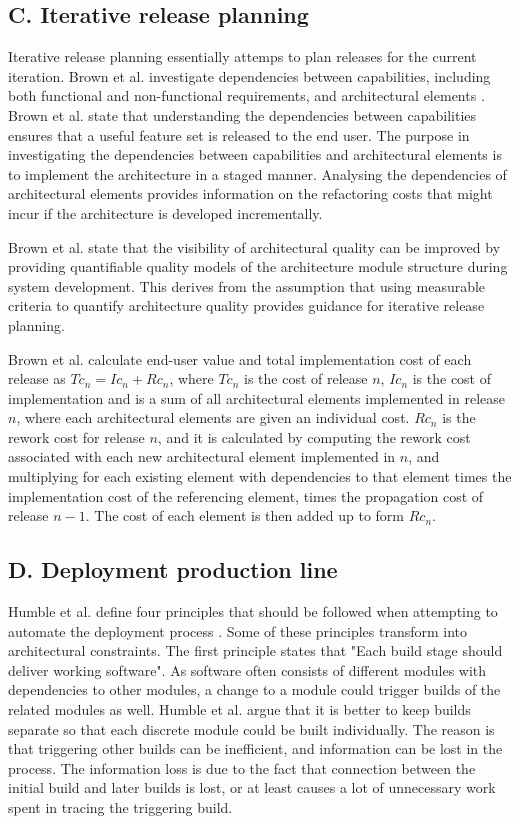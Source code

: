 \documentclass[conference]{IEEEtran}
\begin{document}
\subsection{C. Iterative release planning}

Iterative release planning essentially attemps to plan releases for the current iteration. Brown et al. investigate dependencies between capabilities, including both functional and non-functional requirements, and architectural elements \cite{brown2011analysis}. Brown et al. state that understanding the dependencies between capabilities ensures that a useful feature set is released to the end user. The purpose in investigating the dependencies between capabilities and architectural elements is to implement the architecture in a staged manner. Analysing the dependencies of architectural elements provides information on the refactoring costs that might incur if the architecture is developed incrementally.

Brown et al. state that the visibility of architectural quality can be improved by providing quantifiable quality models of the architecture module structure during system development. This derives from the assumption that using measurable criteria to quantify architecture quality provides guidance for iterative release planning.

Brown et al. calculate end-user value and total implementation cost of each release as $Tc_n = Ic_n + Rc_n$, where $Tc_n$ is the cost of release $n$, $Ic_n$ is the cost of implementation and is a sum of all architectural elements implemented in release $n$, where each architectural elements are given an individual cost. $Rc_n$ is the rework cost for release $n$, and it is calculated by computing the rework cost associated with each new architectural element implemented in $n$, and multiplying for each existing element with dependencies to that element times the implementation cost of the referencing element, times the propagation cost of release $n-1$. The cost of each element is then added up to form $Rc_n$.

\subsection{D. Deployment production line}

Humble et al. define four principles that should be followed when attempting to automate the deployment process \cite{humble2006deployment}. Some of these principles transform into architectural constraints. The first principle states that "Each build stage should deliver working software". As software often consists of different modules with dependencies to other modules, a change to a module could trigger builds of the related modules as well. Humble et al. argue that it is better to keep builds separate so that each discrete module could be built individually. The reason is that triggering other builds can be inefficient, and information can be lost in the process. The information loss is due to the fact that connection between the initial build and later builds is lost, or at least causes a lot of unnecessary work spent in tracing the triggering build. 
\end{document}

